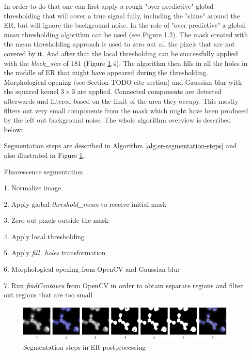 In order to do that one can first apply a rough "over-predictive" global thresholding that will cover a true signal fully, including the "shine" around the ER, but will ignore the background noise. In the role of "over-predictive" a global mean thresholding algorithm can be used (see Figure \ref{fig:er-segmentation-steps}.2). The mask created with the mean thresholding approach is used to zero out all the pixels that are not covered by it. And after that the local thresholding can be successfully applied with the \textit{block\_size} of $181$ (Figure \ref{fig:er-segmentation-steps}.4). The algorithm then fills in all the holes in the middle of ER that might have appeared during the thresholding. Morphological opening (see Section TODO cite section) and Gaussian blur with the squared kernel $3 \times 3$ are applied. Connected components are detected afterwards and filtered based on the limit of the area they occupy. This mostly filters out very small components from the mask which might have been produced by the left out background noise. The whole algorithm overview is described below:

Segmentation steps are described in Algorithm \ref{alg:er-segmentation-steps} and also illustrated in Figure \ref{fig:er-segmentation-steps}.

\begin{algorithm}
    \caption{Fluorescence segmentation}
    \begin{algorithmic}
    \item 1. Normalize image
    \item 2. Apply global \textit{threshold\_mean} to receive initial mask
    \item 3. Zero out pixels outside the mask
    \item 4. Apply local thresholding
    \item 5. Apply \textit{fill\_holes} transformation
    \item 6. Morphological opening from OpenCV and Gaussian blur
    \item 7. Run \textit{findContours} from OpenCV in order to obtain separate regions and filter out regions that are too small
    \end{algorithmic}
    \label{alg:er-segmentation-steps}
\end{algorithm}    

\begin{figure}[htb]
    \begin{center}
        \includegraphics[width=\linewidth]{bilder/ER/segmentation/segmentation.png}
        \caption{Segmentation steps in ER postprocessing}\label{fig:er-segmentation-steps}
    \end{center}
\end{figure}